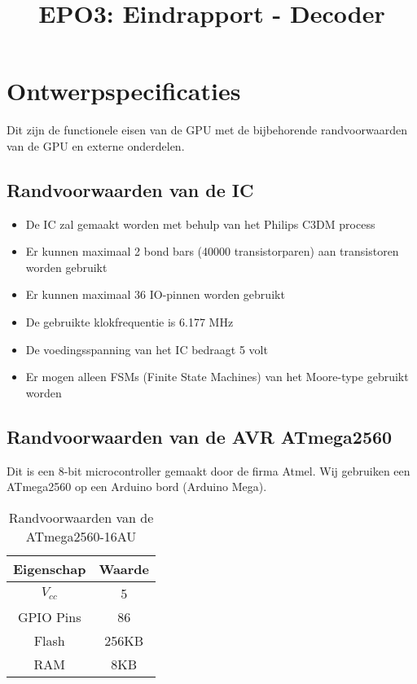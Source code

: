 \documentclass{scrartcl} %
\author{}
\title{EPO3: Eindrapport - Decoder}
\begin{document}
\chapter{Ontwerpspecificaties}
\label{ch:spec}

Dit zijn de functionele eisen van de GPU met de bijbehorende randvoorwaarden van de GPU en externe onderdelen.

\section {Randvoorwaarden van de IC}
\begin {itemize}
\item De IC zal gemaakt worden met behulp van het Philips C3DM process \cite{epo3-manual}
\item Er kunnen maximaal 2 bond bars (40000 transistorparen) aan transistoren worden gebruikt
\item Er kunnen maximaal 36 IO-pinnen worden gebruikt
\item De gebruikte klokfrequentie is 6.177 MHz
\item De voedingsspanning van het IC bedraagt 5 volt
\item Er mogen alleen FSMs (Finite State Machines) van het Moore-type gebruikt worden
\end {itemize}

\section {Randvoorwaarden van de AVR ATmega2560}
Dit is een 8-bit microcontroller gemaakt door de firma Atmel. Wij gebruiken een ATmega2560 op een Arduino bord (Arduino Mega).
\begin{table}[H]
\centering
\caption{Randvoorwaarden van de ATmega2560-16AU\cite{AVR}}
\label{tab:spec-avr}
\begin{tabular}{c c}
	\hline\hline
 	Eigenschap & Waarde\\
 	\hline
	$V_{cc}$ & 5\volt \\
	GPIO Pins & 86 \\
	Flash & 256KB \\
	RAM & 8KB \\
  	\hline
\end{tabular}
\end{table} 
\end{document}
